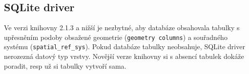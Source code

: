 \subsection{SQLite driver}
Ve verzi knihovny  2.1.3 a nižší je nezbytné, aby databáze obsahovala tabulky s upřesněním podoby obsažené geometrie (\verb|geometry columns|) a souřadného systému (\verb|spatial_ref_sys|). Pokud databáze tabulky neobsahuje, SQLite driver nerozezná datový typ vrstvy. Novější verze knihovny si s absencí tabulek dokáže poradit, resp už si tabulky vytvoří sama.

